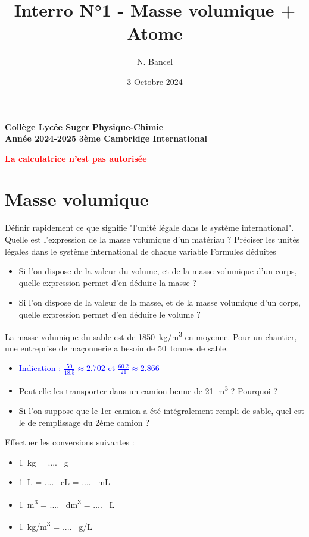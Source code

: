 \documentclass{exam}
\title{Interro N°1 - Masse volumique + Atome}
\author{N. Bancel}
\date{3 Octobre 2024}
\begin{document}
\textbf{Collège Lycée Suger}
\hfill
\textbf{Physique-Chimie} \\

\textbf{Année 2024-2025}
\hfill
\textbf{3ème Cambridge International} \par

{\let\newpage\relax\maketitle}

\begin{center}
  \textbf{\textcolor{red}{La calculatrice n'est pas autorisée}}
  \end{center}

\section*{Masse volumique}

\begin{questions}
  \question[0.5] Définir rapidement ce que signifie "l'unité légale dans le système international".
  \question[1] Quelle est l'expression de la masse volumique d'un matériau ? Préciser les unités légales dans le système international de chaque variable
  \question[1] Formules déduites 
  \begin{itemize}
    \item Si l'on dispose de la valeur du volume, et de la masse volumique d'un corps, quelle expression permet d'en déduire la masse ?
    \item Si l'on dispose de la valeur de la masse, et de la masse volumique d'un corps, quelle expression permet d'en déduire le volume ?
  \end{itemize}
  \question[2] La masse volumique du sable est de \SI{1850}{kg/m^3} en moyenne. Pour un chantier, une entreprise de maçonnerie a besoin de \SI{50}{tonnes} de sable.
  \begin{itemize}
    \item \textcolor{blue}{Indication : $\frac{50}{18.5} \approx 2.702$ et $\frac{60.2}{21} \approx 2.866$}
    \item Peut-elle les transporter dans un camion benne de \SI{21}{m^3} ? Pourquoi ?
    \item Si l'on suppose que le 1er camion a été intégralement rempli de sable, quel est le \text{\%} de remplissage du 2ème camion ?
\end{itemize}

\question[2] Effectuer les conversions suivantes : 
  \begin{itemize}
    \item \SI{1}{kg} = .... \SI{}{g}
    \item \SI{1}{L} = .... \SI{}{cL} = .... \SI{}{mL}
    \item \SI{1}{m^3} = .... \SI{}{dm^3} = .... \SI{}{L}
    \item \SI{1}{kg/m^3} = .... \SI{}{g/L}
\end{itemize}

\end{questions}
\end{document}
